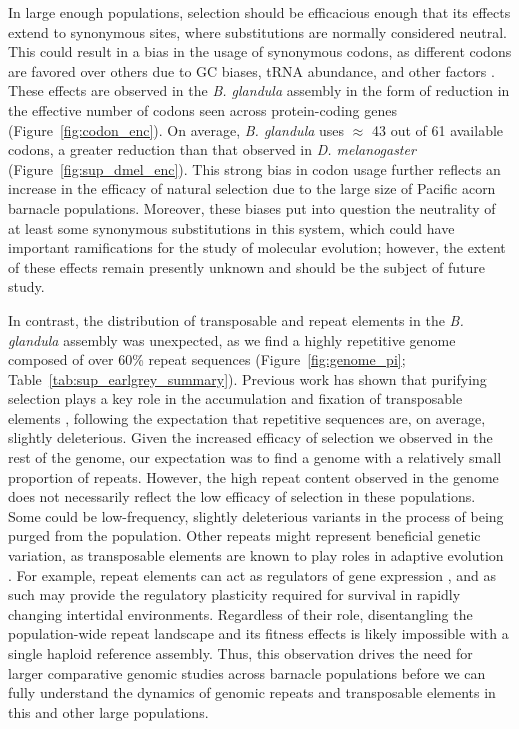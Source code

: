 \documentclass[11pt]{article}
\newcommand{\bgla}{\textit{B. glandula}\xspace}
\begin{document}
In large enough populations, selection should be efficacious enough that its effects
extend to synonymous sites, where substitutions are normally considered neutral.
This could result in a bias in the usage of synonymous codons, as different codons are
favored over others due to GC biases, tRNA abundance, and other factors
\citep{galtier_codon_2018}.
These effects are observed in the \bgla{} assembly in the form of reduction in the
effective number of codons seen across protein-coding genes (Figure~\ref{fig:codon_enc}).
On average, \bgla{} uses $\approx$ 43 out of 61 available codons, a greater reduction
than that observed in \textit{D. melanogaster} (Figure~\ref{fig:sup_dmel_enc}).
This strong bias in codon usage further reflects an increase in the efficacy of natural
selection due to the large size of Pacific acorn barnacle populations.
Moreover, these biases put into question the neutrality of at least some synonymous
substitutions in this system, which could have important ramifications for the study of
molecular evolution; however, the extent of these effects remain presently unknown and
should be the subject of future study.
\vspace{0.2cm}

In contrast, the distribution of transposable and repeat elements in the
\bgla{} assembly was unexpected, as we find a highly repetitive genome
composed of over 60\% repeat sequences (Figure~\ref{fig:genome_pi};
Table~\ref{tab:sup_earlgrey_summary}).
Previous work has shown that purifying selection plays a key role in the accumulation
and fixation of transposable elements \citep{merel_relaxed_2025,langmuller_genomic_2023,
bourque_ten_2018}, following the expectation that repetitive sequences are, on average,
slightly deleterious.
Given the increased efficacy of selection we observed in the rest of the genome,
our expectation was to find a genome with a relatively small proportion of repeats.
However, the high repeat content observed in the genome does not necessarily
reflect the low efficacy of selection in these populations.
Some could be low-frequency, slightly deleterious variants in the process of being purged
from the population.
Other repeats might represent beneficial genetic variation, as transposable elements are
known to play roles in adaptive evolution \citep{schrader_impact_2019}.
For example, repeat elements can act as regulators of gene expression
\citep{trizzino_transposable_2017,rech_population-scale_2022}, and as such may provide
the regulatory plasticity required for survival in rapidly changing
intertidal environments.
Regardless of their role, disentangling the population-wide repeat landscape and its
fitness effects is likely impossible with a single haploid reference assembly.
Thus, this observation drives the need for larger comparative genomic studies across
barnacle populations before we can fully understand the dynamics of genomic repeats
and transposable elements in this and other large populations.
\end{document}
